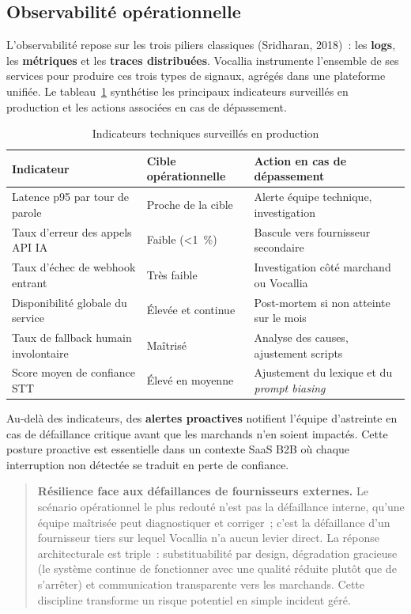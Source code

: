 \subsection{Observabilité opérationnelle}
\label{subsec:scal_observabilite}

L'observabilité repose sur les trois piliers classiques (Sridharan, 2018)~: les \textbf{logs}, les \textbf{métriques} et les \textbf{traces distribuées}. Vocallia instrumente l'ensemble de ses services pour produire ces trois types de signaux, agrégés dans une plateforme unifiée. Le tableau~\ref{tab:kpi_techniques} synthétise les principaux indicateurs surveillés en production et les actions associées en cas de dépassement.

\begin{table}[H]
\centering
\caption{Indicateurs techniques surveillés en production}
\label{tab:kpi_techniques}
\begin{tabular}{|p{5cm}|p{4cm}|p{5cm}|}
\hline
\textbf{Indicateur} & \textbf{Cible opérationnelle} & \textbf{Action en cas de dépassement} \\
\hline
Latence p95 par tour de parole & Proche de la cible & Alerte équipe technique, investigation \\
\hline
Taux d'erreur des appels API IA & Faible (<1~\%) & Bascule vers fournisseur secondaire \\
\hline
Taux d'échec de webhook entrant & Très faible & Investigation côté marchand ou Vocallia \\
\hline
Disponibilité globale du service & Élevée et continue & Post-mortem si non atteinte sur le mois \\
\hline
Taux de fallback humain involontaire & Maîtrisé & Analyse des causes, ajustement scripts \\
\hline
Score moyen de confiance STT & Élevé en moyenne & Ajustement du lexique et du \emph{prompt biasing} \\
\hline
\end{tabular}
\end{table}

Au-delà des indicateurs, des \textbf{alertes proactives} notifient l'équipe d'astreinte en cas de défaillance critique avant que les marchands n'en soient impactés. Cette posture proactive est essentielle dans un contexte SaaS B2B où chaque interruption non détectée se traduit en perte de confiance.

\begin{quote}
\textbf{Résilience face aux défaillances de fournisseurs externes.} Le scénario opérationnel le plus redouté n'est pas la défaillance interne, qu'une équipe maîtrisée peut diagnostiquer et corriger~; c'est la défaillance d'un fournisseur tiers sur lequel Vocallia n'a aucun levier direct. La réponse architecturale est triple~: substituabilité par design, dégradation gracieuse (le système continue de fonctionner avec une qualité réduite plutôt que de s'arrêter) et communication transparente vers les marchands. Cette discipline transforme un risque potentiel en simple incident géré.
\end{quote}

